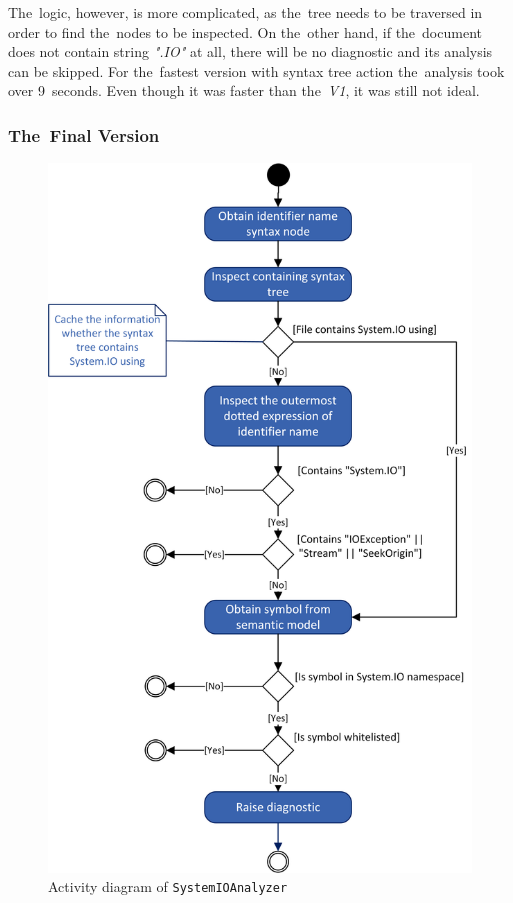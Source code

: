 \documentclass[
  digital, %
  table,   %
  lof,     %
  lot,     %
  oneside,
]{fithesis3}
\begin{document}
The~logic, however, is more complicated, as the~tree needs to be traversed in order to find the~nodes to be inspected. On the~other hand, if the~document does not contain string \textit{".IO"} at all, there will be no diagnostic and its analysis can be skipped. For the~fastest version with syntax tree action the~analysis took over 9~seconds. Even though it was faster than the~\textit{V1}, it was still not ideal.

\subsubsection{\textbf{The~Final Version}}
\begin{figure}
		\centering
			\includegraphics[scale=0.98]{img/uml/system-io-activity-diagram}
		\caption{Activity diagram of \texttt{SystemIOAnalyzer}}
		\label{fig:uml-system-io-activity-diagram}
\end{figure}
\end{document}
